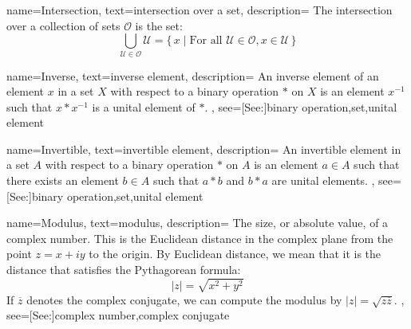 {
    name={Intersection},
    text={intersection over a set},
    description={
        The intersection over a collection of sets $\mathcal{O}$ is the set:
        \begin{equation*}
            \bigcup_{\mathcal{U}\in\mathcal{O}}\mathcal{U}
            =\big\{\,x\;|\;\textrm{For all }\mathcal{U}\in\mathcal{O},
                x\in\mathcal{U}\,\big\}
        \end{equation*}
    }
}

{
    name={Inverse},
    text={inverse element},
    description={
        An inverse element of an element $x$ in a set $X$ with respect to a
        binary operation $*$ on $X$ is an element $x^{\minus{1}}$ such that
        $x*x^{\minus{1}}$ is a unital element of $*$.
    },
    see=[See:]{binary operation,set,unital element}
}

{
    name={Invertible},
    text={invertible element},
    description={
        An invertible element in a set $A$ with respect to a binary
        operation $*$ on $A$ is an element $a\in{A}$ such that there
        exists an element $b\in{A}$ such that $a*b$ and $b*a$ are
        unital elements.
    },
    see=[See:]{binary operation,set,unital element}
}

{
    name={Modulus},
    text={modulus},
    description={
        The size, or absolute value, of a complex number. This is the
        Euclidean distance in the complex plane from the point $z=x+iy$
        to the origin. By Euclidean distance, we mean that it is the
        distance that satisfies the Pythagorean formula:
        \begin{equation*}
            |z|=\sqrt{x^{2}+y^{2}}
        \end{equation*}
        If $\overline{z}$ denotes the complex conjugate, we can compute
        the modulus by $|z|=\sqrt{z\overline{z}}$.
    },
    see=[See:]{complex number,complex conjugate}
}

